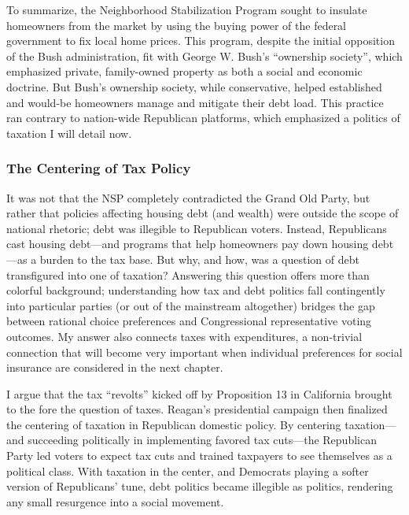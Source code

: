 \documentclass[
]{article}
\begin{document}
To summarize, the Neighborhood Stabilization Program sought to insulate homeowners from the market by using the buying power of the federal government to fix local home prices.
This program, despite the initial opposition of the Bush administration, fit with George W. Bush's ``ownership society'', which emphasized private, family-owned property as both a social and economic doctrine.
But Bush's ownership society, while conservative, helped established and would-be homeowners manage and mitigate their debt load.
This practice ran contrary to nation-wide Republican platforms, which emphasized a politics of taxation I will detail now.

\hypertarget{the-centering-of-tax-policy}{%
\subsubsection{The Centering of Tax Policy}\label{the-centering-of-tax-policy}}

It was not that the NSP completely contradicted the Grand Old Party, but rather that policies affecting housing debt (and wealth) were outside the scope of national rhetoric; debt was illegible to Republican voters.
Instead, Republicans cast housing debt---and programs that help homeowners pay down housing debt---as a burden to the tax base.
But why, and how, was a question of debt transfigured into one of taxation?
Answering this question offers more than colorful background; understanding how tax and debt politics fall contingently into particular parties (or out of the mainstream altogether) bridges the gap between rational choice preferences and Congressional representative voting outcomes.
My answer also connects taxes with expenditures, a non-trivial connection that will become very important when individual preferences for social insurance are considered in the next chapter.

I argue that the tax ``revolts'' kicked off by Proposition 13 in California brought to the fore the question of taxes.
Reagan's presidential campaign then finalized the centering of taxation in Republican domestic policy.
By centering taxation---and succeeding politically in implementing favored tax cuts---the Republican Party led voters to expect tax cuts and trained taxpayers to see themselves as a political class.
With taxation in the center, and Democrats playing a softer version of Republicans' tune, debt politics became illegible as politics, rendering any small resurgence into a social movement.
\end{document}
